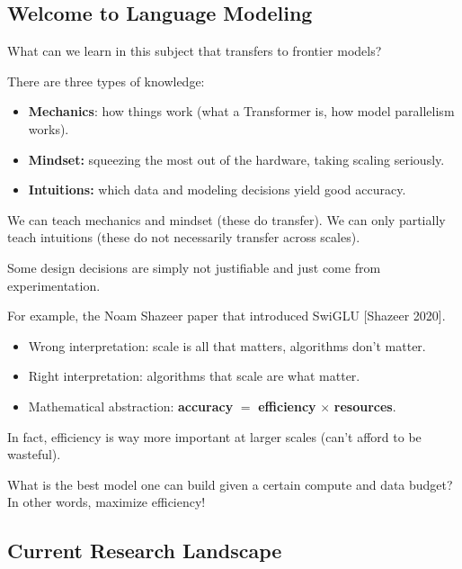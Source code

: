 \documentclass[12pt,twoside]{article}
\begin{document}
\subsection*{Welcome to Language Modeling}

\begin{question}
     What can we learn in this subject that transfers to frontier models?
\end{question}

There are three types of knowledge:

\begin{itemize}
    \item \textbf{Mechanics}: how things work (what a Transformer is, how model parallelism works).
    \item \textbf{Mindset:} squeezing the most out of the hardware, taking scaling seriously.
    \item \textbf{Intuitions:} which data and modeling decisions yield good accuracy.
\end{itemize}

We can teach mechanics and mindset (these do transfer). We can only partially teach intuitions (these do not necessarily transfer across scales).

\begin{remark}
    Some design decisions are simply not justifiable and just come from experimentation. 
\end{remark}

For example, the Noam Shazeer paper that introduced SwiGLU [Shazeer 2020]. 

\begin{itemize}
    \item Wrong interpretation: scale is all that matters, algorithms don't matter.
    \item Right interpretation: algorithms that scale are what matter.
    \item Mathematical abstraction: \textbf{accuracy} \(=\) \textbf{efficiency} \(\times\) \textbf{resources}.
\end{itemize}

In fact, efficiency is way more important at larger scales (can't afford to be wasteful). 

\begin{question}
    What is the best model one can build given a certain compute and data budget? In other words, maximize efficiency!
\end{question}

\subsection*{Current Research Landscape}
\end{document}
